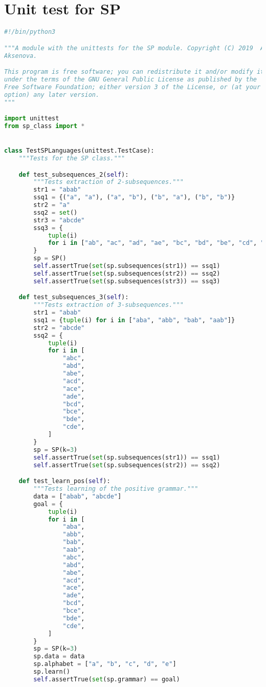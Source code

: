 \section{Unit test for SP}

\begin{lstlisting}[language=Python]
#!/bin/python3

"""A module with the unittests for the SP module. Copyright (C) 2019  Alena
Aksenova.

This program is free software; you can redistribute it and/or modify it
under the terms of the GNU General Public License as published by the
Free Software Foundation; either version 3 of the License, or (at your
option) any later version.
"""

import unittest
from sp_class import *


class TestSPLanguages(unittest.TestCase):
    """Tests for the SP class."""

    def test_subsequences_2(self):
        """Tests extraction of 2-subsequences."""
        str1 = "abab"
        ssq1 = {("a", "a"), ("a", "b"), ("b", "a"), ("b", "b")}
        str2 = "a"
        ssq2 = set()
        str3 = "abcde"
        ssq3 = {
            tuple(i)
            for i in ["ab", "ac", "ad", "ae", "bc", "bd", "be", "cd", "ce", "de"]
        }
        sp = SP()
        self.assertTrue(set(sp.subsequences(str1)) == ssq1)
        self.assertTrue(set(sp.subsequences(str2)) == ssq2)
        self.assertTrue(set(sp.subsequences(str3)) == ssq3)

    def test_subsequences_3(self):
        """Tests extraction of 3-subsequences."""
        str1 = "abab"
        ssq1 = {tuple(i) for i in ["aba", "abb", "bab", "aab"]}
        str2 = "abcde"
        ssq2 = {
            tuple(i)
            for i in [
                "abc",
                "abd",
                "abe",
                "acd",
                "ace",
                "ade",
                "bcd",
                "bce",
                "bde",
                "cde",
            ]
        }
        sp = SP(k=3)
        self.assertTrue(set(sp.subsequences(str1)) == ssq1)
        self.assertTrue(set(sp.subsequences(str2)) == ssq2)

    def test_learn_pos(self):
        """Tests learning of the positive grammar."""
        data = ["abab", "abcde"]
        goal = {
            tuple(i)
            for i in [
                "aba",
                "abb",
                "bab",
                "aab",
                "abc",
                "abd",
                "abe",
                "acd",
                "ace",
                "ade",
                "bcd",
                "bce",
                "bde",
                "cde",
            ]
        }
        sp = SP(k=3)
        sp.data = data
        sp.alphabet = ["a", "b", "c", "d", "e"]
        sp.learn()
        self.assertTrue(set(sp.grammar) == goal)


\end{lstlisting}
